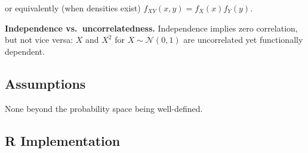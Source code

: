 \documentclass[
]{article}
\begin{document}
or equivalently (when densities exist) \(f_{XY}(x, y) = f_X(x) f_Y(y)\).

\textbf{Independence vs.~uncorrelatedness.} Independence implies zero
correlation, but not vice versa: \(X\) and \(X^2\) for
\(X \sim \mathcal{N}(0, 1)\) are uncorrelated yet functionally
dependent.

\subsection{Assumptions}\label{assumptions}

None beyond the probability space being well-defined.

\subsection{R Implementation}\label{r-implementation}
\end{document}
